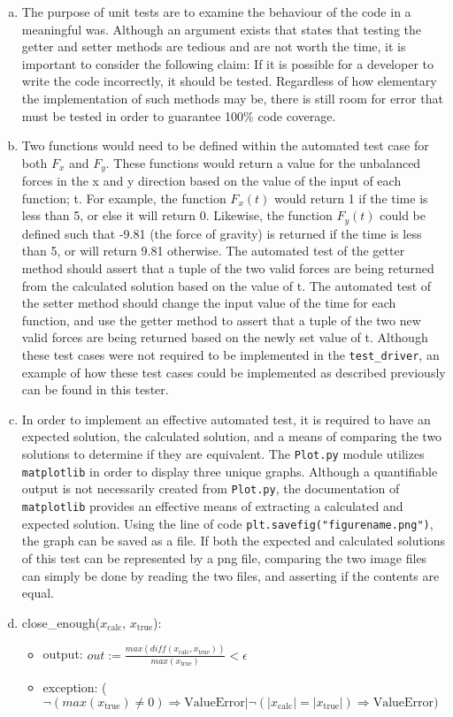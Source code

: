 \documentclass[12pt]{article}
\begin{document}
\begin{enumerate}[a)]

\item The purpose of unit tests are to examine the behaviour of the code in a meaningful was. Although an argument exists that states that testing the getter and setter methods are tedious and are not worth the time, it is important to consider the following claim: If it is possible for a developer to write the code incorrectly, it should be tested. Regardless of how elementary the implementation of such methods may be, there is still room for error that must be tested in order to guarantee 100\% code coverage. 

\item Two functions would need to be defined within the automated test case for both $F_x$ and $F_y$. These functions would return a value for the unbalanced forces in the x and y direction based on the value of the input of each function; t. For example, the function $F_x(t)$ would return 1 if the time is less than 5, or else it will return 0. Likewise, the function $F_y(t)$ could be defined such that -9.81 (the force of gravity) is returned if the time is less than 5, or will return 9.81 otherwise. The automated test of the getter method should assert that a tuple of the two valid forces are being returned from the calculated solution based on the value of t. The automated test of the setter method should change the input value of the time for each function, and use the getter method to assert that a tuple of the two new valid forces are being returned based on the newly set value of t. Although these test cases were not required to be implemented in the \texttt{test\_driver}, an example of how these test cases could be implemented as described previously can be found in this tester. 

\item In order to implement an effective automated test, it is required to have an expected solution, the calculated solution, and a means of comparing the two solutions to determine if they are equivalent. The \texttt{Plot.py} module utilizes \texttt{matplotlib} in order to display three unique graphs. Although a quantifiable output is not necessarily created from \texttt{Plot.py}, the documentation of \texttt{matplotlib} provides an effective means of extracting a calculated and expected solution. Using the line of code \texttt{plt.savefig("figurename.png")}, the graph can be saved as a file. If both the expected and calculated solutions of this test can be represented by a png file, comparing the two image files can simply be done by reading the two files, and asserting if the contents are equal.
\newpage
\item
\noindent close\_enough($x_\text{calc}$, $x_\text{true}$):
\begin{itemize}
\item output: $out := \frac{max(diff(x_\text{calc}, x_\text{true}))} {max( x_\text{true})} < \epsilon$
\item exception: ($\neg (max(x_\text{true}) \neq 0) \Rightarrow \text{ValueError} | \neg(|x_\text{calc}| = |x_\text{true}|) \Rightarrow \text{ValueError})$
\end{itemize}


\end{enumerate}
\end{document}
